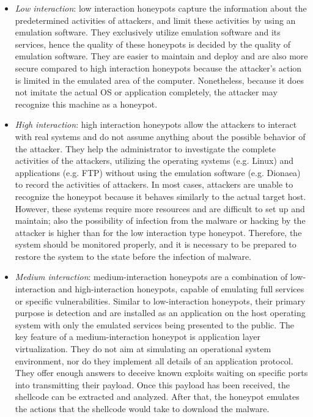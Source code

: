 \documentclass[epsfig,a4paper,11pt,titlepage,oneside,openany]{book}
\begin{document}
\begin{itemize}
\item \textit{Low interaction}: low interaction honeypots capture the information about the predetermined activities of attackers, and limit these activities by using an emulation software. They exclusively utilize emulation software and its services, hence the quality of these honeypots is decided by the quality of emulation software. They are easier to maintain and deploy and are also more secure compared to high interaction honeypots because the attacker’s action is limited in the emulated area of the computer. Nonetheless, because it does not imitate the actual OS or application completely, the attacker may recognize this machine as a honeypot.

\item \textit{High interaction}: high interaction honeypots allow the attackers to interact with real systems and do not assume anything about the possible behavior of the attacker. They help the administrator to investigate the complete activities of the attackers, utilizing the operating systems (e.g. Linux) and applications (e.g. FTP) without using the emulation software (e.g. Dionaea) to record the activities of attackers. In most cases, attackers are unable to recognize the honeypot because it behaves similarly to the actual target host. However, these systems require more resources and are difficult to set up and maintain; also the possibility of infection from the malware or hacking by the attacker is higher than for the low interaction type honeypot. Therefore, the system should be monitored properly, and it is necessary to be prepared to restore the system to the state before the infection of malware.

\item \textit{Medium interaction}: medium-interaction honeypots are a combination of low-interaction and high-interaction honeypots, capable of emulating full services or specific vulnerabilities. Similar to low-interaction honeypots, their primary purpose is detection and are installed as an application on the host operating system with only the emulated services being presented to the public. The key feature of a medium-interaction honeypot is application layer virtualization. They do not aim at simulating an operational system environment, nor do they implement all details of an application protocol. They offer enough answers to deceive known exploits waiting on specific ports into transmitting their payload. Once this payload has been received, the shellcode can be extracted and analyzed. After that, the honeypot emulates the actions that the shellcode would take to download the malware.

\end{itemize}
\end{document}
